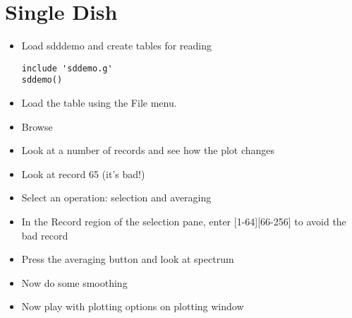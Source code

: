 \section{Single Dish}

\begin{itemize}
\item Load sdddemo and create tables for reading
\begin{verbatim}
include 'sddemo.g'
sddemo()
\end{verbatim}
\item Load the table using the File menu.
\item Browse
\item Look at a number of records and see how the plot changes
\item Look at record 65 (it's bad!)
\item Select an operation: selection and averaging
\item In the Record region of the selection pane, enter [1-64][66-256]
to avoid the bad record
\item Press the averaging button and look at spectrum
\item Now do some smoothing
\item Now play with plotting options on plotting window
\end{itemize}
